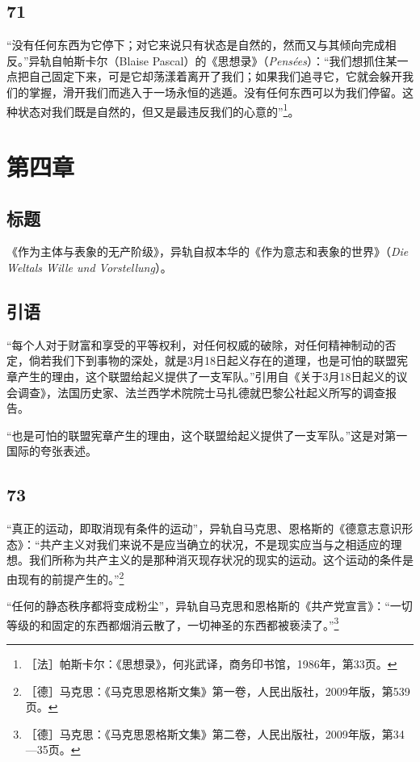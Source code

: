 \documentclass[fontset=fandol, a4paper, 12pt, openright]{ctexbook}
\begin{document}
\subsection*{71}
“没有任何东西为它停下；对它来说只有状态是自然的，然而又与其倾向完成相反。”异轨自帕斯卡尔（Blaise Pascal）的《思想录》（\textit{Pensées}）：“我们想抓住某一点把自己固定下来，可是它却荡漾着离开了我们；如果我们追寻它，它就会躲开我们的掌握，滑开我们而逃入于一场永恒的逃遁。没有任何东西可以为我们停留。这种状态对我们既是自然的，但又是最违反我们的心意的”\footnote{［法］帕斯卡尔：《思想录》，何兆武译，商务印书馆，1986年，第33页。}。

\section*{第四章}

\subsection*{标题}
《作为主体与表象的无产阶级》，异轨自叔本华的《作为意志和表象的世界》（\textit{Die Weltals Wille und Vorstellung}）。

\subsection*{引语}
“每个人对于财富和享受的平等权利，对任何权威的破除，对任何精神制动的否定，倘若我们下到事物的深处，就是3月18日起义存在的道理，也是可怕的联盟宪章产生的理由，这个联盟给起义提供了一支军队。”引用自《关于3月18日起义的议会调查》，法国历史家、法兰西学术院院士马扎德就巴黎公社起义所写的调查报告。

“也是可怕的联盟宪章产生的理由，这个联盟给起义提供了一支军队。”这是对第一国际的夸张表述。

\subsection*{73}
“真正的运动，即取消现有条件的运动”，异轨自马克思、恩格斯的《德意志意识形态》：“共产主义对我们来说不是应当确立的状况，不是现实应当与之相适应的理想。我们所称为共产主义的是那种消灭现存状况的现实的运动。这个运动的条件是由现有的前提产生的。”\footnote{［德］马克思：《马克思恩格斯文集》第一卷，人民出版社，2009年版，第539页。}

“任何的静态秩序都将变成粉尘”，异轨自马克思和恩格斯的《共产党宣言》：“一切等级的和固定的东西都烟消云散了，一切神圣的东西都被亵渎了。”\footnote{［德］马克思：《马克思恩格斯文集》第二卷，人民出版社，2009年版，第34—35页。}
\end{document}
